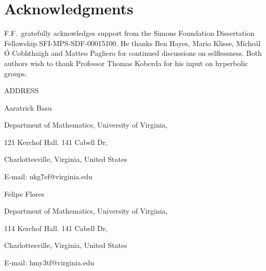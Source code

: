 \documentclass[11pt]{article}
\theoremstyle{definition}
\theoremstyle{remark}
\numberwithin{equation}{section}
\numberwithin{equation}{section}
\numberwithin{equation}{section}
\begin{document}
\section*{Acknowledgments}

F.F.\ gratefully acknowledges support from the Simons Foundation Dissertation Fellowship SFI-MPS-SDF-00015100. He thanks Ben Hayes, Mario Klisse, M\'iche\'al \'O Cobhthaigh and Matteo Pagliero for continued discussions on selflessness. Both authors wish to thank Professor Thomas Koberda for his input on hyperbolic groups.




\printbibliography

\bigskip
\bigskip
ADDRESS

\smallskip
\smallskip
Aaratrick Basu

Department of Mathematics, University of Virginia,

121 Kerchof Hall. 141 Cabell Dr,

Charlottesville, Virginia, United States

E-mail: ukg7ef@virginia.edu

\smallskip
\smallskip
Felipe Flores

Department of Mathematics, University of Virginia,

114 Kerchof Hall. 141 Cabell Dr,

Charlottesville, Virginia, United States

E-mail: hmy3tf@virginia.edu
\end{document}
